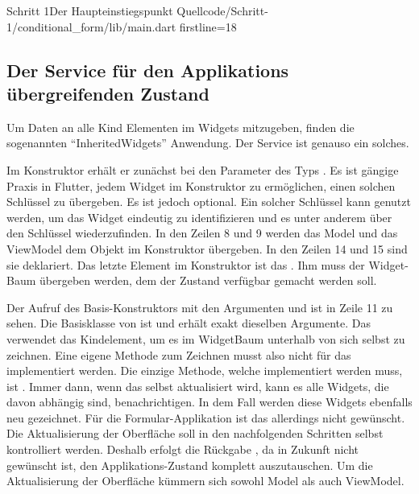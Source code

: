 \begin{alexlisting}{Schritt 1}{Der Haupteinstiegspunkt}
  {Quellcode/Schritt-1/conditional_form/lib/main.dart}
  {firstline=18}
  \label{lst:Schritt1DerHaupteinstiegspunkt}
\end{alexlisting}

\ifincludeall \clearpage \fi
\subsection{Der Service für den Applikations übergreifenden Zustand}




Um Daten an alle Kind Elementen im Widgets mitzugeben, finden die sogenannten \enquote{InheritedWidgets} Anwendung.
Der Service  \Lst{\ref{lst:Schritt1DerServiceAppState}} ist genauso ein solches.

Im Konstruktor erhält er zunächst bei den Parameter des Typs  .
Es ist gängige Praxis in Flutter, jedem Widget im Konstruktor zu ermöglichen, einen solchen Schlüssel zu übergeben.
Es ist jedoch optional.
 Ein solcher Schlüssel kann genutzt werden, um das Widget eindeutig zu identifizieren und es unter anderem über den Schlüssel wiederzufinden.
In den Zeilen 8 und 9 werden das Model und das ViewModel dem Objekt  im Konstruktor übergeben.
In den Zeilen 14 und 15 sind sie deklariert.
Das letzte Element im Konstruktor ist das .
Ihm muss der Widget-Baum übergeben werden, dem der Zustand verfügbar gemacht werden soll.

Der Aufruf des Basis-Konstruktors mit den Argumenten  und  ist in Zeile 11 zu sehen.
Die Basisklasse von  ist  und erhält exakt dieselben Argumente.
 Das  verwendet das Kindelement, um es im WidgetBaum unterhalb von sich selbst zu zeichnen.
 Eine eigene Methode zum Zeichnen musst also nicht für das  implementiert werden.
Die einzige Methode, welche implementiert werden muss, ist  .
Immer dann, wenn das  selbst aktualisiert wird, kann es alle Widgets, die davon abhängig sind, benachrichtigen.
 In dem Fall werden diese  Widgets ebenfalls neu gezeichnet.
Für die Formular-Applikation ist das allerdings nicht gewünscht.
Die Aktualisierung der Oberfläche soll in den nachfolgenden Schritten selbst kontrolliert werden.
Deshalb erfolgt die Rückgabe , da in Zukunft nicht gewünscht ist, den Applikations-Zustand komplett auszutauschen.
 Um die  Aktualisierung  der Oberfläche  kümmern sich sowohl Model als auch ViewModel.

